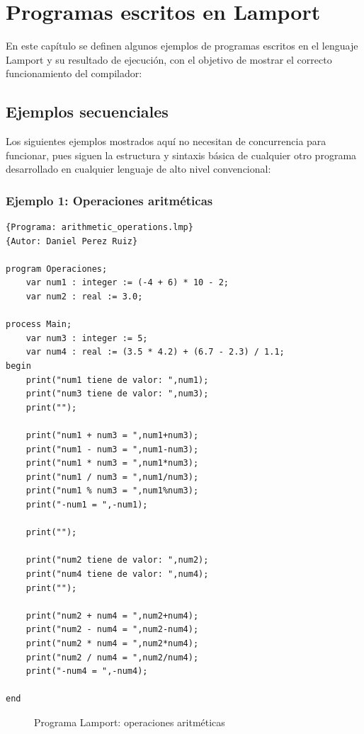\chapter{\textbf{Programas escritos en Lamport}}
En este capítulo se definen algunos ejemplos de programas escritos en el lenguaje Lamport y su resultado de ejecución, con el objetivo de mostrar el correcto funcionamiento del compilador:

\section{Ejemplos secuenciales}
Los siguientes ejemplos mostrados aquí no necesitan de concurrencia para funcionar, pues siguen la estructura y sintaxis básica de cualquier otro programa desarrollado en cualquier lenguaje de alto nivel convencional:

\subsection{Ejemplo 1: Operaciones aritméticas}
\begin{lstlisting}[style=lamportStyle]
{Programa: arithmetic_operations.lmp}
{Autor: Daniel Perez Ruiz}

program Operaciones;
	var num1 : integer := (-4 + 6) * 10 - 2;
	var num2 : real := 3.0;

process Main;
	var num3 : integer := 5;
	var num4 : real := (3.5 * 4.2) + (6.7 - 2.3) / 1.1;
begin
	print("num1 tiene de valor: ",num1);
	print("num3 tiene de valor: ",num3);
	print("");
	
	print("num1 + num3 = ",num1+num3);
	print("num1 - num3 = ",num1-num3);
	print("num1 * num3 = ",num1*num3);
	print("num1 / num3 = ",num1/num3);
	print("num1 % num3 = ",num1%num3);
	print("-num1 = ",-num1);
	
	print("");
	
	print("num2 tiene de valor: ",num2);
	print("num4 tiene de valor: ",num4);	
	print("");
	
	print("num2 + num4 = ",num2+num4);
	print("num2 - num4 = ",num2-num4);
	print("num2 * num4 = ",num2*num4);
	print("num2 / num4 = ",num2/num4);
	print("-num4 = ",-num4);
	
end
\end{lstlisting}
\begin{figure}[h]
\caption{Programa Lamport: operaciones aritméticas}
\label{fig:lamportArithmeticOperations}
\end{figure}

